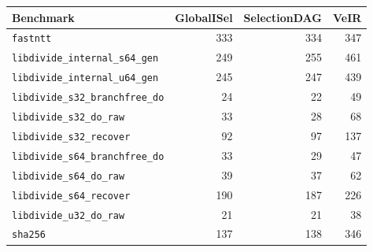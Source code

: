     \centering
    \footnotesize
    \begin{tabular}{l r r r }
        \toprule
        \textbf{Benchmark} & \textbf{GlobalISel} & \textbf{SelectionDAG} & \textbf{VeIR} \\
        \midrule
        \texttt{fastntt} & 333 & 334 & 347 \\
        \texttt{libdivide\_internal\_s64\_gen} & 249 & 255 & 461 \\
        \texttt{libdivide\_internal\_u64\_gen} & 245 & 247 & 439 \\
        \texttt{libdivide\_s32\_branchfree\_do} & 24 & 22 & 49 \\
        \texttt{libdivide\_s32\_do\_raw} & 33 & 28 & 68 \\
        \texttt{libdivide\_s32\_recover} & 92 & 97 & 137 \\
        \texttt{libdivide\_s64\_branchfree\_do} & 33 & 29 & 47 \\
        \texttt{libdivide\_s64\_do\_raw} & 39 & 37 & 62 \\
        \texttt{libdivide\_s64\_recover} & 190 & 187 & 226 \\
        \texttt{libdivide\_u32\_do\_raw} & 21 & 21 & 38 \\
        \texttt{sha256} & 137 & 138 & 346 \\
        \bottomrule
    \end{tabular}
    \caption{\#Cycles per iteration}
    \label{num_cycles_table_real}